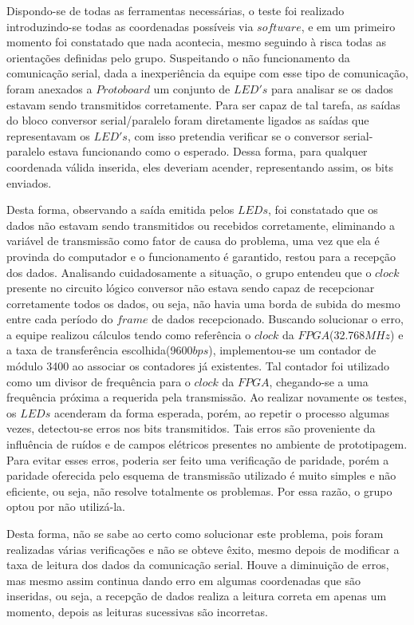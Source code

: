 \documentclass[12pt]{article}
\begin{document}
Dispondo-se de todas as ferramentas necessárias, o teste foi realizado introduzindo-se todas as coordenadas possíveis via $software$, e em um primeiro momento foi constatado que nada acontecia, mesmo seguindo à risca todas as orientações definidas pelo grupo. Suspeitando o não funcionamento da comunicação serial, dada a inexperiência da equipe com esse tipo de comunicação, foram anexados a $Protoboard$ um conjunto de $LED's$ para analisar se os dados estavam sendo transmitidos corretamente. Para ser capaz de tal tarefa, as saídas do bloco conversor serial/paralelo foram diretamente ligados as saídas que representavam os $LED's$, com isso pretendia verificar se o conversor serial-paralelo estava funcionando como o esperado. Dessa forma, para qualquer coordenada válida inserida, eles deveriam acender, representando assim, os bits enviados.


Desta forma, observando a saída emitida pelos $LEDs$, foi constatado que os dados não estavam sendo transmitidos ou recebidos corretamente, eliminando a variável de transmissão como fator de causa do problema, uma vez que ela é provinda do computador e o funcionamento é garantido, restou para a recepção dos dados. Analisando cuidadosamente a situação, o grupo entendeu que o $clock$ presente no circuito lógico conversor não estava sendo capaz de recepcionar corretamente todos os dados, ou seja, não havia uma borda de subida do mesmo entre cada período do $frame$ de dados recepcionado. Buscando solucionar o erro, a equipe realizou cálculos tendo como referência o $clock$ da $FPGA$(32.768$MHz$) e a taxa de transferência escolhida(9600$bps$), implementou-se um contador de módulo 3400 ao associar os contadores já existentes. Tal contador foi utilizado como um divisor de frequência para o $clock$ da $FPGA$, chegando-se a uma frequência próxima a requerida pela transmissão. Ao realizar novamente os testes, os $LEDs$ acenderam da forma esperada, porém, ao repetir o processo algumas vezes, detectou-se erros nos bits transmitidos. Tais erros são proveniente da influência de ruídos e de campos elétricos presentes no ambiente de prototipagem. Para evitar esses erros, poderia ser feito uma verificação de paridade, porém a paridade oferecida pelo esquema de transmissão utilizado é muito simples e não eficiente, ou seja, não resolve totalmente os problemas. Por essa razão, o grupo optou por não utilizá-la.

Desta forma, não se sabe ao certo como solucionar este problema, pois foram realizadas várias verificações e não se obteve êxito, mesmo depois de modificar a taxa de leitura dos dados da comunicação serial. Houve a diminuição de erros, mas mesmo assim continua dando erro em algumas coordenadas que são inseridas, ou seja, a recepção de dados realiza a leitura correta em apenas um momento, depois as leituras sucessivas são incorretas.
\end{document}
